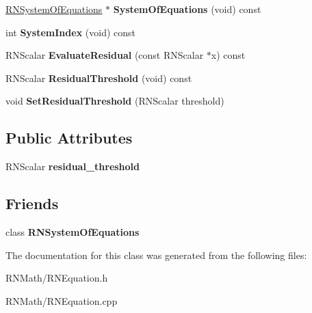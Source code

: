 \begin{DoxyCompactItemize}
\item 
\hyperlink{class_r_n_system_of_equations}{R\+N\+System\+Of\+Equations} $\ast$ {\bfseries System\+Of\+Equations} (void) const \hypertarget{class_r_n_equation_a919f93650d78cfef1b654cbfdcb6086d}{}\label{class_r_n_equation_a919f93650d78cfef1b654cbfdcb6086d}

\item 
int {\bfseries System\+Index} (void) const \hypertarget{class_r_n_equation_a84d40bc2e73df81ef758ef82b76c4cc5}{}\label{class_r_n_equation_a84d40bc2e73df81ef758ef82b76c4cc5}

\item 
R\+N\+Scalar {\bfseries Evaluate\+Residual} (const R\+N\+Scalar $\ast$x) const \hypertarget{class_r_n_equation_a2b65580b56154432338255e6f64bfa67}{}\label{class_r_n_equation_a2b65580b56154432338255e6f64bfa67}

\item 
R\+N\+Scalar {\bfseries Residual\+Threshold} (void) const \hypertarget{class_r_n_equation_a6462083f36dd092dbc865c3e10ab1972}{}\label{class_r_n_equation_a6462083f36dd092dbc865c3e10ab1972}

\item 
void {\bfseries Set\+Residual\+Threshold} (R\+N\+Scalar threshold)\hypertarget{class_r_n_equation_af196550c51c9f9d66f35621e607ccf2f}{}\label{class_r_n_equation_af196550c51c9f9d66f35621e607ccf2f}

\end{DoxyCompactItemize}
\subsection*{Public Attributes}
\begin{DoxyCompactItemize}
\item 
R\+N\+Scalar {\bfseries residual\+\_\+threshold}\hypertarget{class_r_n_equation_a9aed266362179cd7cb02112799d8c25b}{}\label{class_r_n_equation_a9aed266362179cd7cb02112799d8c25b}

\end{DoxyCompactItemize}
\subsection*{Friends}
\begin{DoxyCompactItemize}
\item 
class {\bfseries R\+N\+System\+Of\+Equations}\hypertarget{class_r_n_equation_ac4ba8a47caec50ec1c219221ae1d1d41}{}\label{class_r_n_equation_ac4ba8a47caec50ec1c219221ae1d1d41}

\end{DoxyCompactItemize}


The documentation for this class was generated from the following files\+:\begin{DoxyCompactItemize}
\item 
R\+N\+Math/R\+N\+Equation.\+h\item 
R\+N\+Math/R\+N\+Equation.\+cpp\end{DoxyCompactItemize}
